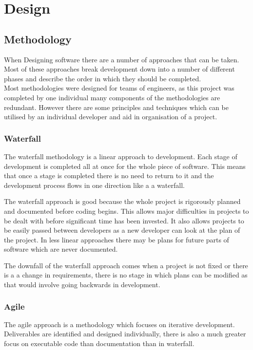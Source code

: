 \documentclass{UoYCSproject}
\begin{document}
\chapter{Design}

\section{Methodology}
When Designing software there are a number of approaches that can be taken. Most of these approaches break development down into a number of different phases and describe the order in which they should be completed.\\

Most methodologies were designed for teams of engineers, as this project was completed by one individual many components of the methodologies are redundant. However there are some principles and techniques which can be utilised by an individual developer and aid in organisation of a project.

\subsection{Waterfall}
The waterfall methodology is a linear approach to development. Each stage of development is completed all at once for the whole piece of software. This means that once a stage is completed there is no need to return to it and the development process flows in one direction like a a waterfall.

The waterfall approach is good because the whole project is rigorously planned and documented before coding begins. This allows major difficulties in projects to be dealt with before significant time has been invested. It also allows projects to be easily passed between developers as a new developer can look at the plan of the project. In less linear approaches there may be plans for future parts of software which are never documented.

The downfall of the waterfall approach comes when a project is not fixed or there is a a change in requirements, there is no stage in which plans can be modified as that would involve going backwards in development.


\subsection{Agile}
The agile approach is a methodology which focuses on iterative development. Deliverables are identified and designed individually, there is also a much greater focus on executable code than documentation than in waterfall.
\end{document}
